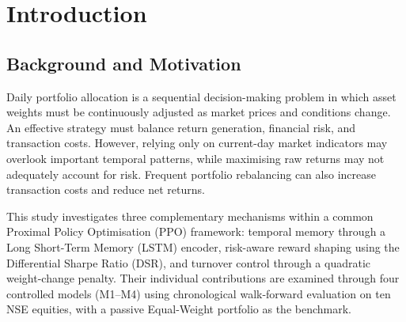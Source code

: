 \chapter{Introduction}
\label{ch:intro}

\section{Background and Motivation}
Daily portfolio allocation is a sequential decision-making problem in which asset weights must be continuously adjusted as market prices and conditions change. An effective strategy must balance return generation, financial risk, and transaction costs. However, relying only on current-day market indicators may overlook important temporal patterns, while maximising raw returns may not adequately account for risk. Frequent portfolio rebalancing can also increase transaction costs and reduce net returns.

This study investigates three complementary mechanisms within a common Proximal Policy Optimisation (PPO) framework: temporal memory through a Long Short-Term Memory (LSTM) encoder, risk-aware reward shaping using the Differential Sharpe Ratio (DSR), and turnover control through a quadratic weight-change penalty. Their individual contributions are examined through four controlled models (M1--M4) using chronological walk-forward evaluation on ten NSE equities, with a passive Equal-Weight portfolio as the benchmark.
